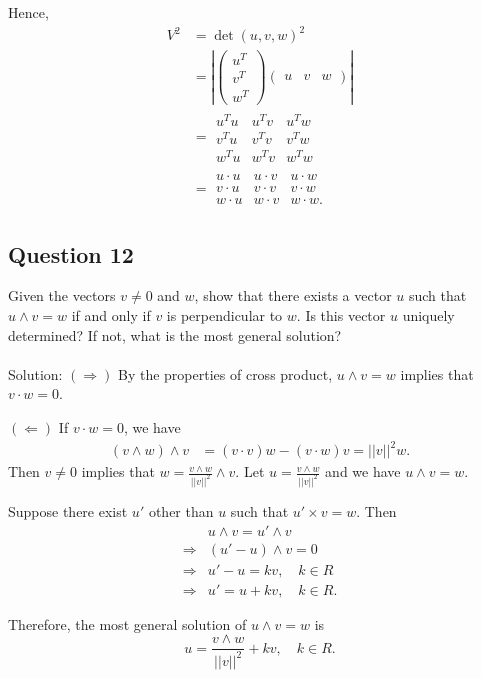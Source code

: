 \documentclass[12pt]{article}
\begin{document}
Hence, \begin{align*}
     V^2 &= \det (u,v,w)^2\\
     &=|\begin{pmatrix}
     u^T\\
     v^T\\
     w^T
     \end{pmatrix}
     \begin{pmatrix}
      u&v&w
     \end{pmatrix}|\\
     &=\begin{array}{|ccc|}
     u^T u & u^T v & u^T w\\
     v^T u & v^T v & v^T w\\
     w^T u & w^T v & w^T w
     \end{array}\\
     &=\begin{array}{|ccc|}
     u \cdot u & u \cdot v & u \cdot w\\
     v \cdot u & v \cdot v & v \cdot w\\
     w \cdot u & w \cdot v & w \cdot w.
     \end{array}
 \end{align*}
\subsection*{Question 12}
Given the vectors $v \neq 0$ and $w$, show that there exists a vector $u$ such that $u \wedge v = w$ if and only if $v$ is perpendicular to $w$. Is this vector $u$ uniquely determined? If not, what is the most general solution?\\\\
Solution: $(\Rightarrow)$ By the properties of cross product, $u \wedge v = w$ implies that $v \cdot w = 0$.

$(\Leftarrow)$ If $v\cdot w=0$, we have \begin{align*}
     (v\wedge w)\wedge v &= (v\cdot v)w - (v\cdot w)v=||v||^2w.
\end{align*}
Then $v\neq 0$ implies that $w = \frac{v\wedge w}{||v||^2}\wedge v$. Let $u=\frac{v\wedge w}{||v||^2}$ and we have $u\wedge v = w$.

Suppose there exist $u'$ other than $u$ such that $u'\times v = w$. Then \begin{align*}
     &u \wedge v = u' \wedge v \\
     \Rightarrow &(u'-u)\wedge v = 0\\
     \Rightarrow &u'-u = kv, \quad k\in R\\
     \Rightarrow &u' = u + kv, \quad k\in R.
\end{align*}

Therefore, the most general solution of $u\wedge v=w$ is \begin{equation*}
     u = \frac{v\wedge w}{||v||^2} + kv,\quad k\in R.
\end{equation*}
\end{document}
